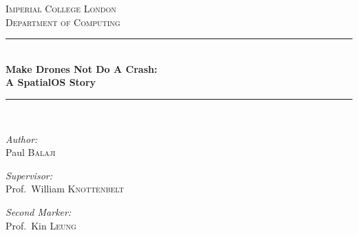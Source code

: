 \documentclass[a4paper,11pt,titlepage]{report}
\begin{document}
\begin{titlepage}

\newcommand{\HRule}{\rule{\linewidth}{0.5mm}} %
\setlength{\topmargin}{0in}
\center %



\textsc{\LARGE Imperial College London}\\[1.5cm] %
\textsc{\Large Department of Computing}\\[0.5cm] %


\HRule \\[0.4cm]
{ \huge \bfseries Make Drones Not Do A Crash:\\A SpatialOS Story}\\[0.4cm] %
\HRule \\[0.4cm]


\begin{minipage}[t]{0.4\textwidth}
\begin{flushleft} \large
\emph{Author:}\\
Paul \textsc{Balaji} \\
\end{flushleft}
\end{minipage}
\begin{minipage}[t]{0.5\textwidth}
\begin{flushright} \large
\emph{Supervisor:} \\
Prof.~William \textsc{Knottenbelt}
\end{flushright}
\begin{flushright} \large
\emph{Second Marker:} \\
Prof.~Kin \textsc{Leung}
\end{flushright}
\end{minipage}\\[1cm]


\end{titlepage}
\end{document}
